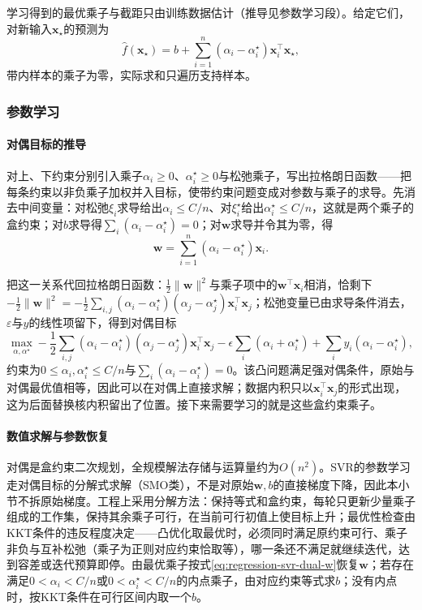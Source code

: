 学习得到的最优乘子与截距只由训练数据估计（推导见参数学习段）。给定它们，对新输入$\bm{x}_\star$的预测为
\[
  \widehat f(\bm{x}_\star)=b+\sum_{i=1}^n(\alpha_i-\alpha_i^\star)\bm{x}_i^{\top}\bm{x}_\star,
\]
带内样本的乘子为零，实际求和只遍历支持样本。

\subsubsection{参数学习}
\label{sec:regression-svr-learning}

\paragraph{对偶目标的推导}

对上、下约束分别引入乘子$\alpha_i\geq0$、$\alpha_i^\star\geq0$与松弛乘子，写出拉格朗日函数——把每条约束以非负乘子加权并入目标，使带约束问题变成对参数与乘子的求导。先消去中间变量：对松弛$\xi_i$求导给出$\alpha_i\leq C/n$、对$\xi_i^\star$给出$\alpha_i^\star\leq C/n$，这就是两个乘子的盒约束；对$b$求导得$\sum_i(\alpha_i-\alpha_i^\star)=0$；对$\bm{w}$求导并令其为零，得
\begin{equation}
  \bm{w}=\sum_{i=1}^n(\alpha_i-\alpha_i^\star)\bm{x}_i.
  \label{eq:regression-svr-dual-w}
\end{equation}

把这一关系代回拉格朗日函数：$\frac12\lVert\bm{w}\rVert^2$与乘子项中的$\bm{w}^{\top}\bm{x}_i$相消，恰剩下$-\frac12\lVert\bm{w}\rVert^2=-\frac12\sum_{i,j}(\alpha_i-\alpha_i^\star)(\alpha_j-\alpha_j^\star)\bm{x}_i^{\top}\bm{x}_j$；松弛变量已由求导条件消去，$\varepsilon$与$y$的线性项留下，得到对偶目标
\begin{equation}
  \max_{\alpha,\alpha^\star}
  -\frac12\sum_{i,j}(\alpha_i-\alpha_i^\star)
    (\alpha_j-\alpha_j^\star)\bm{x}_i^{\top}\bm{x}_j
  -\epsilon\sum_i(\alpha_i+\alpha_i^\star)
  +\sum_i y_i(\alpha_i-\alpha_i^\star),
  \label{eq:regression-svr-dual}
\end{equation}
约束为$0\leq\alpha_i,\alpha_i^\star\leq C/n$与$\sum_i(\alpha_i-\alpha_i^\star)=0$。该凸问题满足强对偶条件，原始与对偶最优值相等，因此可以在对偶上直接求解；数据内积只以$\bm{x}_i^{\top}\bm{x}_j$的形式出现，这为后面替换核内积留出了位置。接下来需要学习的就是这些盒约束乘子。

\paragraph{数值求解与参数恢复}

对偶是盒约束二次规划，全规模解法存储与运算量约为$O(n^2)$。SVR的参数学习走对偶目标的分解式求解（SMO类），不是对原始$\bm{w},b$的直接梯度下降，因此本小节不拆原始梯度。工程上采用分解方法：保持等式和盒约束，每轮只更新少量乘子组成的工作集，保持其余乘子可行，在当前可行初值上使目标上升；最优性检查由KKT条件的违反程度决定——凸优化取最优时，必须同时满足原约束可行、乘子非负与互补松弛（乘子为正则对应约束恰取等），哪一条还不满足就继续迭代，达到容差或迭代预算即停。由最优乘子按式\eqref{eq:regression-svr-dual-w}恢复$\bm{w}$；若存在满足$0<\alpha_i<C/n$或$0<\alpha_i^\star<C/n$的内点乘子，由对应约束等式求$b$；没有内点时，按KKT条件在可行区间内取一个$b$。

